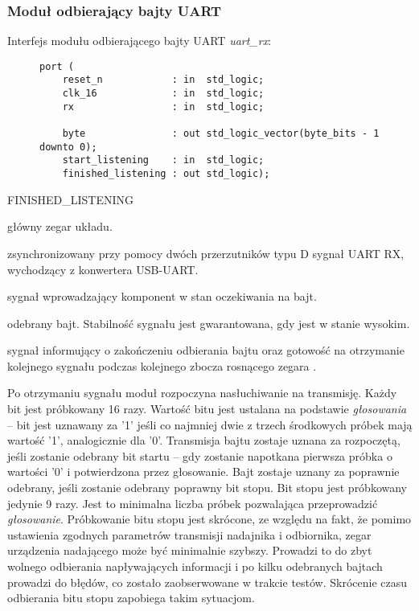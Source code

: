 \subsubsection{Moduł odbierający bajty UART}
Interfejs modułu odbierającego bajty UART \textit{uart\_rx}:

\begin{figure}[!h]
\begin{lstlisting}[style=vhdl]
port (
	reset_n            : in  std_logic;
	clk_16             : in  std_logic;
	rx                 : in  std_logic;
		
	byte               : out std_logic_vector(byte_bits - 1 downto 0);
	start_listening    : in  std_logic;
	finished_listening : out std_logic);
\end{lstlisting}
\end{figure}

\begin{interface}{FINISHED\_LISTENING}
	\item[\insignal{CLK\_16}] główny zegar układu.
	\item[\insignal{RX}] zsynchronizowany przy pomocy dwóch przerzutników typu D sygnał UART RX, wychodzący z konwertera USB-UART.
	\item[\insignal{START\_LISTENING}] sygnał wprowadzający komponent w stan oczekiwania na bajt.
	\item[\outsignal{BYTE[7:0]}] odebrany bajt. Stabilność sygnału jest gwarantowana, gdy  jest w stanie wysokim.
	\item[\outsignal{FINISHED\_LISTENING}] sygnał informujący o zakończeniu odbierania bajtu oraz gotowość na otrzymanie kolejnego sygnału  podczas kolejnego zbocza rosnącego zegara .
\end{interface}

Po otrzymaniu sygnału  moduł rozpoczyna nasłuchiwanie na transmisję. Każdy bit jest próbkowany 16 razy. Wartość bitu jest ustalana na podstawie \textit{głosowania} -- bit jest uznawany za {'1'} jeśli co najmniej dwie z trzech środkowych próbek mają wartość {'1'}, analogicznie dla {'0'}. Transmisja bajtu zostaje uznana za rozpoczętą, jeśli zostanie odebrany bit startu -- gdy zostanie napotkana pierwsza próbka o wartości {'0'} i potwierdzona przez głosowanie. Bajt zostaje uznany za poprawnie odebrany, jeśli zostanie odebrany poprawny bit stopu. Bit stopu jest próbkowany jedynie 9 razy. Jest to minimalna liczba próbek pozwalająca przeprowadzić \textit{głosowanie}. Próbkowanie bitu stopu jest skrócone, ze względu na fakt, że pomimo ustawienia zgodnych parametrów transmisji nadajnika i odbiornika, zegar urządzenia nadającego może być minimalnie szybszy. Prowadzi to do zbyt wolnego odbierania napływających informacji i po kilku odebranych bajtach prowadzi do błędów, co zostało zaobserwowane w trakcie testów. Skrócenie czasu odbierania bitu stopu zapobiega takim sytuacjom.

